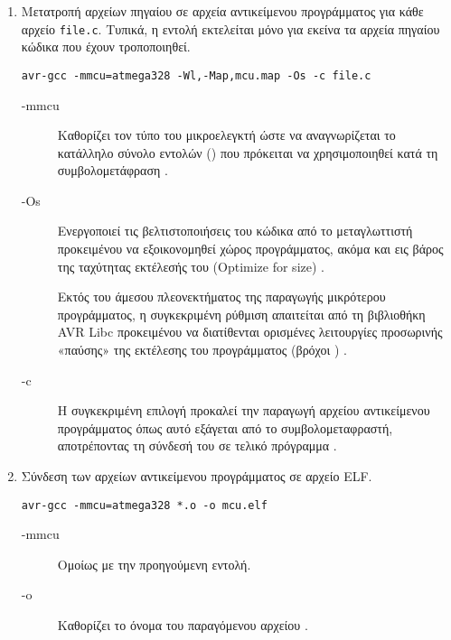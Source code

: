 \begin{enumerate}

    \item Μετατροπή αρχείων πηγαίου σε αρχεία αντικείμενου προγράμματος για κάθε
    αρχείο \verb~file.c~. Τυπικά, η εντολή εκτελείται μόνο για εκείνα τα αρχεία
    πηγαίου κώδικα που έχουν τροποποιηθεί.

\begin{lstlisting}
avr-gcc -mmcu=atmega328 -Wl,-Map,mcu.map -Os -c file.c
\end{lstlisting}

    \begin{description}
        \item[-mmcu] Καθορίζει τον τύπο του μικροελεγκτή ώστε να αναγνωρίζεται
        το κατάλληλο σύνολο εντολών () που πρόκειται να
        χρησιμοποιηθεί κατά τη συμβολομετάφραση \parencite{gcc:options}.

        \item[-Os] Ενεργοποιεί τις βελτιστοποιήσεις του κώδικα από το
        μεταγλωττιστή προκειμένου να εξοικονομηθεί χώρος προγράμματος, ακόμα και
        εις βάρος της ταχύτητας εκτέλεσής του (Optimize for size)
        \parencites[338]{avrlibc}{gcc:options}.

        Εκτός του άμεσου πλεονεκτήματος της παραγωγής μικρότερου προγράμματος, η
        συγκεκριμένη ρύθμιση απαιτείται από τη βιβλιοθήκη AVR Libc προκειμένου
        να διατίθενται ορισμένες λειτουργίες προσωρινής «παύσης» της εκτέλεσης
        του προγράμματος (βρόχοι ) \parencite[328]{avrlibc}.

        \item[-c] Η συγκεκριμένη επιλογή προκαλεί την παραγωγή αρχείου
        αντικείμενου προγράμματος όπως αυτό εξάγεται από το συμβολομεταφραστή,
        αποτρέποντας τη σύνδεσή του σε τελικό πρόγραμμα
        \parencites[338]{avrlibc}{gcc:options}.
    \end{description}


    \item Σύνδεση των αρχείων αντικείμενου προγράμματος σε αρχείο ELF.
\begin{lstlisting}
avr-gcc -mmcu=atmega328 *.o -o mcu.elf
\end{lstlisting}

    \begin{description}
        \item[-mmcu] Ομοίως με την προηγούμενη εντολή.

        \item[-o] Καθορίζει το όνομα του παραγόμενου αρχείου
        \parencite{gcc:options}.
    \end{description}



\end{enumerate}
